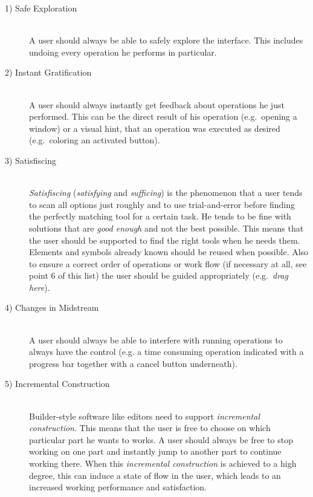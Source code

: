 \documentclass[twoside, openright, 12pt]{book}
\begin{document}
\begin{description}
\item[1) Safe Exploration]\hfill \\
A user should always be able to safely explore the interface.
This includes undoing every operation he performs in particular.

\item[2) Instant Gratification]\hfill \\
A user should always instantly get feedback about operations he just performed.
This can be the direct result of his operation (e.g.~opening a window) or a visual hint, that an operation was executed as desired (e.g.~coloring an activated button).

\item[3) Satisfiscing]\hfill \\
\textit{Satisfiscing} (\textit{satisfying} and \textit{sufficing}) is the phenomenon that a user tends to scan all options just roughly and to use trial-and-error before finding the perfectly matching tool for a certain task.
He tends to be fine with solutions that are \textit{good enough} and not the best possible.
This means that the user should be supported to find the right tools when he needs them.
Elements and symbols already known should be reused when possible.
Also to ensure a correct order of operations or work flow (if necessary at all, see point 6 of this list) the user should be guided appropriately (e.g.~\textit{drag here}).

\item[4) Changes in Midstream]\hfill \\
A user should always be able to interfere with running operations to always have the control (e.g. a time consuming operation indicated with a progress bar together with a cancel button underneath).


\item[5) Incremental Construction]\hfill \\
Builder-style software like editors need to support \textit{incremental construction}.
This means that the user is free to choose on which particular part he wants to works.
A user should always be free to stop working on one part and instantly jump to another part to continue working there.
When this \textit{incremental construction} is achieved to a high degree, this can induce a state of flow in the user, which leads to an increased working performance and satisfaction.
\end{description}
\end{document}
